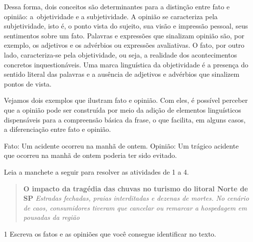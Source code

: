 Dessa forma, dois conceitos são determinantes para a distinção entre
fato e opinião: a~objetividade e a subjetividade. A opinião se
caracteriza pela subjetividade, isto é, o ponto vista do sujeito, sua
visão e impressão pessoal, seus sentimentos sobre um fato. Palavras e
expressões que sinalizam opinião são, por exemplo, os adjetivos e os
advérbios ou expressões avaliativas. O fato, por outro lado,
caracteriza-se pela objetividade, ou seja, a realidade dos
acontecimentos concretos inquestionáveis. Uma marca linguística da
objetividade é a presença do sentido literal das palavras e a ausência
de adjetivos e advérbios que sinalizem pontos de vista.

Vejamos dois exemplos que ilustram fato e opinião. Com eles, é possível
perceber que a opinião pode ser construída por meio da adição de
elementos linguísticos dispensáveis para a compreensão básica da frase,
o que facilita, em alguns casos, a diferenciação entre fato e opinião.

Fato: Um acidente ocorreu na manhã de ontem. Opinião: Um trágico
acidente que ocorreu na manhã de ontem poderia ter sido evitado.


Leia a manchete a seguir para resolver as atividades de 1 a 4.

\begin{quote}
\textbf{O impacto da tragédia das chuvas no turismo do litoral Norte de
SP} \emph{Estradas fechadas, praias interditadas e dezenas de mortes. No
cenário de caos, consumidores tiveram que cancelar ou remarcar a
hospedagem em pousadas da região}
\end{quote}


\num{1} Escreva os fatos e as opiniões que você consegue identificar no
texto.


